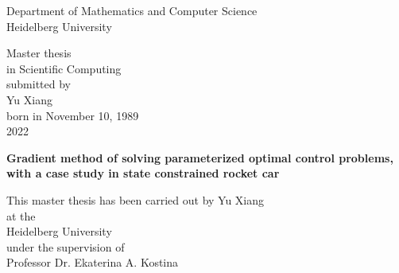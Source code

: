 
\thispagestyle{empty}
\begin{center}
  \renewcommand{\baselinestretch}{2.00}
  \Large\sffamily
  Department of Mathematics and Computer Science\\
  \large Heidelberg University
  \par\vfill\normalfont
  Master thesis\\
  in Scientific Computing\\
  submitted by\\
  Yu Xiang\\
  born in November 10, 1989\\
  2022
\end{center}
\newpage

\thispagestyle{empty}
\begin{center}
  \renewcommand{\baselinestretch}{2.00}
  \Large\bfseries\sffamily
    Gradient method of solving parameterized optimal control problems, with a case study in state constrained rocket car %
  \par
  \vfill
  \large\normalfont
  This master thesis has been carried out by Yu Xiang\\
  at the\\
  Heidelberg University \\
  under the supervision of\\
  Professor Dr. Ekaterina A. Kostina
\end{center}\par
\vspace{5\baselineskip}

\renewcommand{\baselinestretch}{1.00}\normalsize